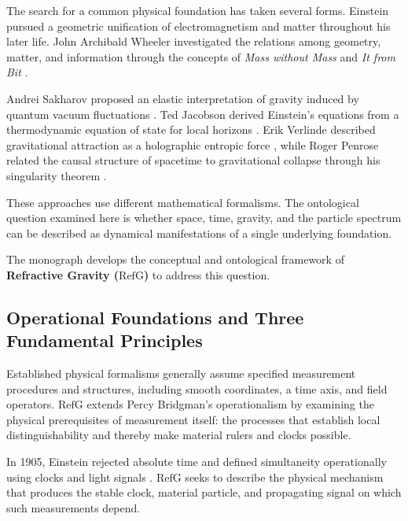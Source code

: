 \documentclass[11pt,a4paper]{article}
\newcommand{\RefG}{\mathrm{RefG}}
\begin{document}
The search for a common physical foundation has taken several forms. Einstein pursued a geometric unification of electromagnetism and matter throughout his later life. John Archibald Wheeler investigated the relations among geometry, matter, and information through the concepts of \textit{Mass without Mass} and \textit{It from Bit} \citep{wheeler1955,wheeler1990}.

Andrei Sakharov proposed an elastic interpretation of gravity induced by quantum vacuum fluctuations \citep{sakharov1967}. Ted Jacobson derived Einstein's equations from a thermodynamic equation of state for local horizons \citep{jacobson1995}. Erik Verlinde described gravitational attraction as a holographic entropic force \citep{verlinde2011}, while Roger Penrose related the causal structure of spacetime to gravitational collapse through his singularity theorem \citep{penrose1965}.

These approaches use different mathematical formalisms. The ontological question examined here is whether space, time, gravity, and the particle spectrum can be described as dynamical manifestations of a single underlying foundation.

The monograph develops the conceptual and ontological framework of \textbf{Refractive Gravity ($\RefG$)} to address this question.

\subsection*{Operational Foundations and Three Fundamental Principles}

Established physical formalisms generally assume specified measurement procedures and structures, including smooth coordinates, a time axis, and field operators. $\RefG$ extends Percy Bridgman's operationalism \citep{bridgman1927} by examining the physical prerequisites of measurement itself: the processes that establish local distinguishability and thereby make material rulers and clocks possible.

In 1905, Einstein rejected absolute time and defined simultaneity operationally using clocks and light signals \citep{einstein1905}. $\RefG$ seeks to describe the physical mechanism that produces the stable clock, material particle, and propagating signal on which such measurements depend.
\end{document}
